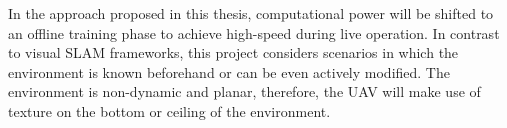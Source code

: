 In the approach proposed in this thesis, computational power will be
shifted to an offline training phase to achieve high-speed during live
operation. In contrast to visual SLAM frameworks, this project considers
scenarios in which the environment is known beforehand or can be even
actively modified. The environment is non-dynamic and planar, therefore, the UAV will make use of texture on the bottom or ceiling of the environment.